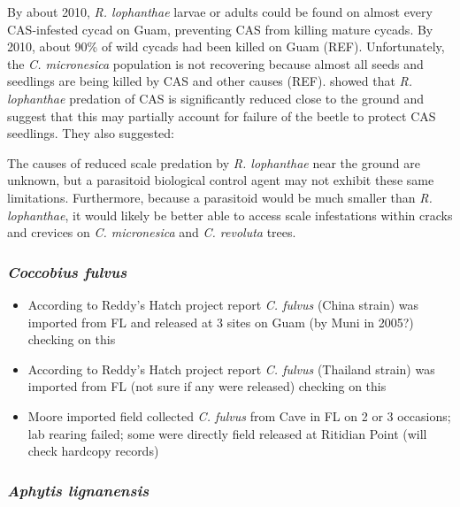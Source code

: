 \documentclass[12pt,letterpaper,english,bibliography=totocnumbered, abstract=on]{scrartcl}
\begin{document}
By about 2010, \textit{R. lophanthae} larvae or adults could be found on almost every CAS-infested cycad on Guam, preventing CAS from killing mature cycads. By 2010, about 90\% of wild cycads had been killed on Guam (REF). Unfortunately, the \textit{C. micronesica} population is not recovering because almost all seeds and seedlings are being killed by CAS and other causes (REF). \cite{marlerVerticalStratificationPredation2013} showed that \textit{R. lophanthae} predation of CAS is significantly reduced close to the ground and suggest that this may partially account for failure of the beetle to protect CAS seedlings. They also suggested:
\begin{displayquote}
The causes of reduced scale predation by
\textit{R. lophanthae} near the ground are unknown,
but a parasitoid biological control agent may
not exhibit these same limitations. Furthermore, because a parasitoid would be much
smaller than \textit{R. lophanthae}, it would likely be
better able to access scale infestations within
cracks and crevices on \textit{C. micronesica} and
\textit{C. revoluta} trees.
\end{displayquote}

\subsubsection{\textit{Coccobius fulvus}} 

\begin{itemize}
	\item According to Reddy's Hatch project report \parencite{usda-reeisBiologicalControlCycad2007} \textit{C. fulvus} (China strain) was imported from FL and released at 3 sites on Guam (by Muni in 2005?) checking on this
	
	\item According to Reddy's Hatch project report \textit{C. fulvus} (Thailand strain) was imported from FL (not sure if any were released) checking on this
	
	\item Moore imported field collected \textit{C. fulvus} from Cave in FL on 2 or 3 occasions; lab rearing failed; some were directly field released at Ritidian Point (will check hardcopy records) 
\end{itemize}


\subsubsection{\textit{Aphytis lignanensis}}
\end{document}
